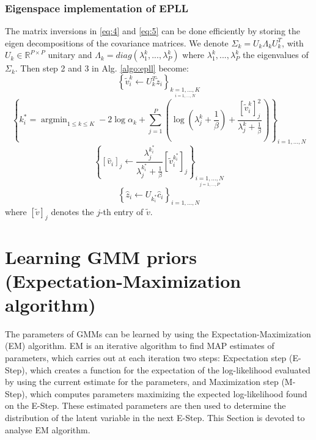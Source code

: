 \documentclass[12pt,a4paper]{article}
\DeclareMathOperator*{\argmin}{argmin}
\begin{document}
\subsubsection{Eigenspace implementation of EPLL}
The matrix inversions in \eqref{eq:4} and \eqref{eq:5} can be done efficiently by storing the eigen decompositions of the covariance matrices.
We denote $\Sigma_k = U_k \Lambda_k U_k^T$, with $U_k \in \mathbb{R}^{P \times P}$ unitary and $\Lambda_k = diag(\lambda_1^k,...,\lambda_P^k)$ where $\lambda_1^k,...,\lambda_P^k$ the eigenvalues of $\Sigma_k$.
Then step 2 and 3 in Alg. \ref{algo:epll} become:
\begin{equation}
    \left\{\tilde{v}_i^k \xleftarrow{} U_k^T \tilde{z}_i \right \}_{\underset{i = 1,...,N}{k = 1,...,K}}
\end{equation}
\begin{equation}
     \left\{k_i^* = \argmin _{1 \leq k \leq K} -2\log\alpha_k + \sum_{j = 1}^P \left( \log (\lambda_j^k + \frac{1}{\beta}) + \frac{[\tilde{v}_i^k]_j^2}{\lambda_j^k + \frac{1}{\beta}}\right)\right \}_{i = 1,...,N}
\end{equation}
\begin{equation}
    \left\{[\hat{v}_i]_j \xleftarrow{} \frac{\lambda_j^{k_i^*}}{\lambda_j^{k_i^*} + \frac{1}{\beta}}[\tilde{v}_i^{k_i^*}]_j\right \}_{\underset{j = 1,...,P}{i = 1,...,N}}
\end{equation}
\begin{equation}
    \left\{ \hat{z}_i \xleftarrow{} U_{k_i^*}\hat{c}_i \right\} _{i = 1,...,N}
\end{equation}
where $[\tilde{v}]_j$ denotes the $j$-th entry of $\tilde{v}$.


\section{Learning GMM priors (Expectation\hyp{}Maximization algorithm)}
The parameters of GMMs can be learned by using the Expectation\hyp{}Maximization (EM) algorithm.
EM is an iterative algorithm to find MAP estimates of parameters, which carries out at each iteration two steps:
 Expectation step (E\hyp{}Step), which creates a function for the expectation of the log\hyp{}likelihood evaluated by using the current estimate for the parameters,
 and Maximization step (M\hyp{}Step), which computes parameters maximizing the expected log\hyp{}likelihood found on the E\hyp{}Step.
These estimated parameters are then used to determine the distribution of the latent variable in the next E\hyp{}Step.
This Section is devoted to analyse EM algorithm.
\end{document}
